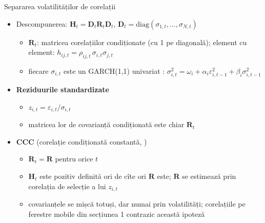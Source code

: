 \begin{frame}{Separarea volatilităților de corelații}
\itemsize{\small}
\begin{itemize}
    \item Descompunerea: $\mathbf{H}_t = \mathbf{D}_t\mathbf{R}_t\mathbf{D}_t$, \quad $\mathbf{D}_t = \mathrm{diag}(\sigma_{1,t}, \dots, \sigma_{N,t})$
    \begin{itemize}
        \item $\mathbf{R}_t$: matricea corelațiilor condiționate (cu 1 pe diagonală); element cu element: $h_{ij,t} = \rho_{ij,t}\,\sigma_{i,t}\sigma_{j,t}$
        \item fiecare $\sigma_{i,t}$ este un GARCH(1,1) univariat : $\sigma_{i,t}^2 = \omega_i + \alpha_i\varepsilon_{i,t-1}^2 + \beta_i\sigma_{i,t-1}^2$
    \end{itemize}
    \item \textbf{Reziduurile standardizate}
    \begin{itemize}
        \item $z_{i,t} = \varepsilon_{i,t}/\sigma_{i,t}$
        \item matricea lor de covarianță condiționată este chiar $\mathbf{R}_t$
    \end{itemize}
    \item \textbf{CCC} (corelație condiționată constantă, )
    \begin{itemize}
        \item $\mathbf{R}_t = \mathbf{R}$ pentru orice $t$
        \item $\mathbf{H}_t$ este pozitiv definită ori de cîte ori $\mathbf{R}$ este; $\mathbf{R}$ se estimează prin corelația de selecție a lui $z_{i,t}$
        \item covarianțele se mișcă totuși, dar numai prin volatilități; corelațiile pe ferestre mobile din secțiunea 1 contrazic această ipoteză
    \end{itemize}
\end{itemize}
\end{frame}

